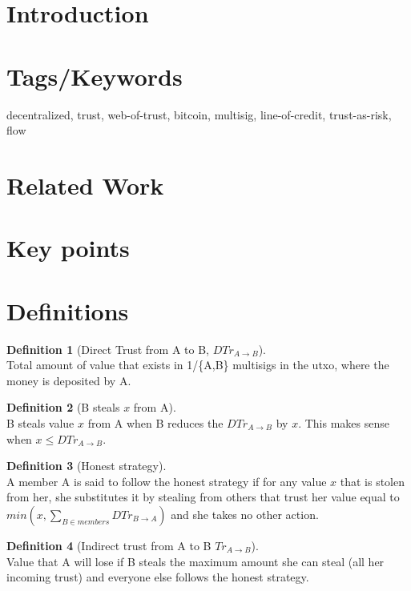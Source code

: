 \documentclass[11pt]{article}
\theoremstyle{definition}
\newtheorem{definition}{Definition}[section]
\theoremstyle{corollary}
\begin{document}
  \section{Introduction}

  \section{Tags/Keywords}
      decentralized, trust, web-of-trust, bitcoin, multisig, line-of-credit, trust-as-risk, flow  

  \section{Related Work}

  \section{Key points}

  \section{Definitions}
      \begin{definition}[Direct Trust from A to B, $DTr_{A \rightarrow B}$] \ \\
         Total amount of value that exists in 1/\{A,B\} multisigs in the utxo, where the money is deposited by A.
      \end{definition}
      \begin{definition}[B steals $x$ from A] \ \\
         B steals value $x$ from A when B reduces the $DTr_{A \rightarrow B}$ by $x$. This makes sense when 
         $x \leq DTr_{A \rightarrow B}$.
      \end{definition}
      \begin{definition}[Honest strategy] \ \\
         A member A is said to follow the honest strategy if for any value $x$ that is stolen from her, she
         substitutes it by stealing from others that trust her value equal to
         $min(x,\sum_{B \in members}{DTr_{B \rightarrow A}})$ and she takes no other action.
      \end{definition}
      \begin{definition}[Indirect trust from A to B $Tr_{A \rightarrow B}$] \ \\
         Value that A will lose if B steals the maximum amount she can steal (all her incoming trust) and everyone
         else follows the honest strategy.
      \end{definition}
\end{document}
